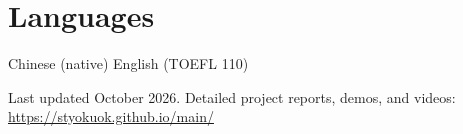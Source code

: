 \documentclass[10pt,letterpaper]{article}
\begin{document}
\section{Languages}
Chinese (native) \quad English (TOEFL 110)

\vfill
{\footnotesize Last updated October 2026. Detailed project reports, demos, and videos: \href{https://styokuok.github.io/main/}{https://styokuok.github.io/main/}}
\end{document}
